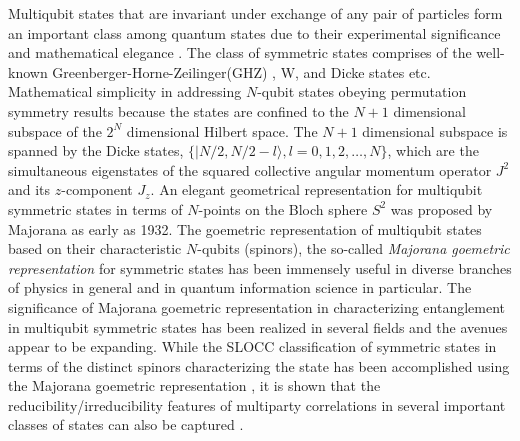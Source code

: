 Multiqubit states that are invariant under exchange of any pair of particles form an important class among quantum states due to their experimental significance and mathematical elegance \cite{sym1,sym1a,sym1b,sym2,sym3}. The class of symmetric states comprises of the well-known Greenberger-Horne-Zeilinger(GHZ) \cite{ghz}, W, and Dicke states \cite{dicke} etc. Mathematical simplicity in addressing $N$-qubit  states obeying permutation symmetry results because the states are confined to the $N+1$ dimensional subspace of the $2^N$ dimensional Hilbert space. The $N+1$ dimensional subspace is spanned by the Dicke states, $\{\vert N/2, N/2-l\rangle,  l=0,1,2,\ldots,N\}$, which are the simultaneous eigenstates of the squared collective angular momentum operator $J^2$ and its $z$-component $J_z$. An elegant geometrical representation for  multiqubit symmetric states in terms of $N$-points on the Bloch sphere $S^2$ was proposed by Majorana \cite{majorana} as early as 1932. The goemetric representation of multiqubit states based on their characteristic $N$-qubits (spinors), the so-called {\em Majorana goemetric representation} for symmetric states \cite{majorana,1945,makela} has been  immensely useful in diverse branches of physics \cite{1945,jpa4,arxiv4,jpa5,ejtp6} in general and in quantum information science \cite{solano, mixed, usa, usa1,usa2,markham1,markham2,gebastin,markham3} in particular.  The significance of Majorana goemetric representation in characterizing entanglement in multiqubit symmetric states has been realized in several fields and the avenues appear to be expanding. While the SLOCC classification of symmetric states in terms of the distinct spinors characterizing the state has been accomplished using the Majorana goemetric representation \cite{solano, mixed}, it is shown that the reducibility/irreducibility features of multiparty correlations in several important classes of states can also be captured \cite{usa1,usa2,usa}. 

